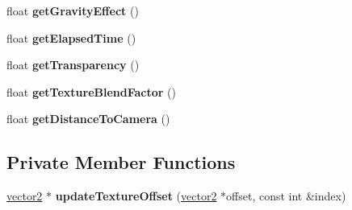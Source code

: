 \begin{DoxyCompactItemize}
\item 
\mbox{\label{classflounder_1_1particle_ad63243ad144632fc3f1402c2d8896ead}} 
float {\bfseries get\+Gravity\+Effect} ()
\item 
\mbox{\label{classflounder_1_1particle_a47672795730ab744ee1a9b9e6fe32991}} 
float {\bfseries get\+Elapsed\+Time} ()
\item 
\mbox{\label{classflounder_1_1particle_a279e94d13fad7e03bcb293a7fdf7daa9}} 
float {\bfseries get\+Transparency} ()
\item 
\mbox{\label{classflounder_1_1particle_ad4a7d6a97c28adba15c6fdfe6b46261f}} 
float {\bfseries get\+Texture\+Blend\+Factor} ()
\item 
\mbox{\label{classflounder_1_1particle_a694ec8ec5b6b43dbd2bc1d0fbbd3cf97}} 
float {\bfseries get\+Distance\+To\+Camera} ()
\end{DoxyCompactItemize}
\subsection*{Private Member Functions}
\begin{DoxyCompactItemize}
\item 
\mbox{\label{classflounder_1_1particle_ac263c9719d21291530488c6fbb642dca}} 
\hyperlink{classflounder_1_1vector2}{vector2} $\ast$ {\bfseries update\+Texture\+Offset} (\hyperlink{classflounder_1_1vector2}{vector2} $\ast$offset, const int \&index)
\end{DoxyCompactItemize}
